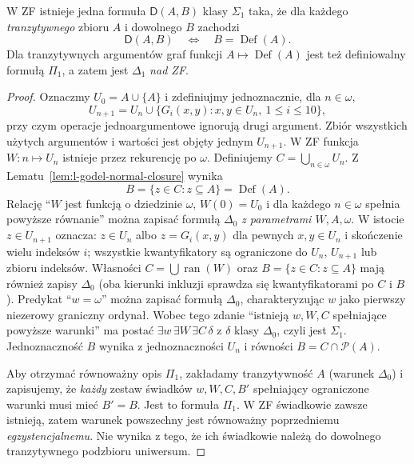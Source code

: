 \begin{lemat}
\label{lem:l-def-sigma1-certificate-75}
W ZF istnieje jedna formuła $\mathsf D(A,B)$ klasy
$\Sigma_1$ taka, że dla każdego \emph{tranzytywnego}
zbioru $A$ i dowolnego $B$ zachodzi
\[
\mathsf D(A,B)\quad\Longleftrightarrow\quad
B=\operatorname{Def}(A).
\]
Dla tranzytywnych argumentów graf funkcji
$A\mapsto\operatorname{Def}(A)$ jest też definiowalny
formułą $\Pi_1$, a zatem jest $\Delta_1$ \emph{nad ZF}.
\end{lemat}
\begin{proof}
Oznaczmy $U_0=A\cup\{A\}$ i zdefiniujmy
jednoznacznie, dla $n\in\omega$,
\[
U_{n+1}=U_n\cup
\{G_i(x,y):x,y\in U_n,\ 1\le i\le10\},
\]
przy czym operacje jednoargumentowe ignorują drugi
argument. Zbiór wszystkich użytych argumentów i wartości
jest objęty jednym $U_{n+1}$. W ZF funkcja
$W:n\mapsto U_n$ istnieje przez rekurencję po $\omega$.
Definiujemy $C=\bigcup_{n\in\omega}U_n$.
Z Lematu~\ref{lem:l-godel-normal-closure} wynika
\[
B=\{z\in C:z\subseteq A\}
  =\operatorname{Def}(A).
\]
Relację ``$W$ jest funkcją o dziedzinie $\omega$,
$W(0)=U_0$ i dla każdego $n\in\omega$ spełnia powyższe
równanie'' można zapisać formułą $\Delta_0$
\emph{z parametrami $W,A,\omega$}. W istocie
$z\in U_{n+1}$ oznacza: $z\in U_n$ albo
$z=G_i(x,y)$ dla pewnych $x,y\in U_n$ i skończenie
wielu indeksów $i$; wszystkie kwantyfikatory są
ograniczone do $U_n$, $U_{n+1}$ lub zbioru indeksów.
Własności $C=\bigcup\operatorname{ran}(W)$ oraz
$B=\{z\in C:z\subseteq A\}$ mają również zapisy
$\Delta_0$ (oba kierunki inkluzji sprawdza się
kwantyfikatorami po $C$ i $B$).
Predykat ``$w=\omega$'' można zapisać formułą
$\Delta_0$, charakteryzując $w$ jako pierwszy
niezerowy graniczny ordynał. Wobec tego zdanie
``istnieją $w,W,C$ spełniające powyższe warunki''
ma postać $\exists w\,\exists W\,\exists C\,\delta$
z $\delta$ klasy $\Delta_0$, czyli jest $\Sigma_1$.
Jednoznaczność $B$ wynika z jednoznaczności
$U_n$ i równości $B=C\cap\mathcal P(A)$.

Aby otrzymać równoważny opis $\Pi_1$,
zakładamy tranzytywność $A$ (warunek $\Delta_0$)
i zapisujemy, że \emph{każdy} zestaw świadków
$w,W,C,B'$ spełniający ograniczone warunki
musi mieć $B'=B$. Jest to formuła $\Pi_1$.
W ZF świadkowie zawsze istnieją, zatem warunek
powszechny jest równoważny poprzedniemu \emph{egzystencjalnemu}. Nie wynika z tego, że ich świadkowie
należą do dowolnego tranzytywnego podzbioru uniwersum.
\end{proof}

